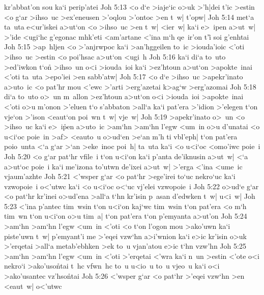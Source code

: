 kr'abbat'on
sou
ka`i
perip'atei\bibvsend
\vs Joh 5:13
<o
d`e
>iaje`ic
o>uk
>'h|dei
t'ic
>estin
<o
g`ar
>ihso~uc
>ex'eneusen
>'oqlou
>'ontoc
>en
t~w|
t'opw|\bibvsend
\vs Joh 5:14
met`a
ta~uta
e<ur'iskei
a>ut`on
<o
>ihso~uc
>en
t~w|
<ier~w|
ka`i
e>~ipen
a>ut~w|
>'ide
<ugi`hc
g'egonac
mhk'eti
<am'artane
<'ina
m`h
qe~ir'on
t'i\r{}
soi
g'enhtai\bibvsend
\vs Joh 5:15
>ap~hljen
<o
>'anjrwpoc
ka`i
>an'hggeilen
to~ic
>iouda'ioic
<'oti
>ihso~uc
>estin
<o
poi'hsac
a>ut`on
<ugi~h\bibvsend
\vs Joh 5:16
ka`i
di`a
to~uto
>ed'iwkon
t`on\r{}
>ihso~un
o<i
>iouda~ioi
ka`i
>ez'htoun
a>ut`on
>apokte~inai
<'oti
ta~uta
>epo'iei
>en
sabb'atw|\bibvsend
\vs Joh 5:17
<o
d`e
>ihso~uc
>apekr'inato
a>uto~ic
<o
pat'hr
mou
<'ewc
>'arti
>erg'azetai
k>ag`w
>erg'azomai\bibvsend
\vs Joh 5:18
di`a
to~uto
o>~un
m~allon
>ez'htoun
a>ut`on
o<i
>iouda~ioi
>apokte~inai
<'oti
o>u
m'onon
>'eluen
t`o
s'abbaton
>all`a
ka`i
pat'era
>'idion
>'elegen
t`on
vje`on
>'ison
<eaut`on
poi~wn
t~w|
vje~w|\bibvsend
\vs Joh 5:19
>apekr'inato
o>~un
<o
>ihso~uc
ka`i
e>~i\r{p}en
a>uto~ic
>am`hn
>am`hn
l'egw
<um~in
o>u
d'unatai
<o
u<i`oc
poie~in
>af>
<eauto~u
o>ud`en
>e`an
m'h
ti
vbl'eph|
t`on
pat'era
poio~unta
<`a
g`ar
>`an
>eke~inoc
poi~h|
ta~uta
ka`i
<o
u<i`oc
<omo'iwc
poie~i\bibvsend
\vs Joh 5:20
<o
g`ar
pat`hr
vfile~i
t`on
u<i`on
ka`i
p'anta
de'iknusin
a>ut~w|
<`a
a>ut`oc
poie~i
ka`i
me'izona
to'utwn
de'ixei
a>ut~w|
>'erga
<'ina
<ume~ic
vjaum'azhte\bibvsend
\vs Joh 5:21
<'wsper
g`ar
<o
pat`hr
>ege'irei
to`uc
nekro`uc
ka`i
vzwopoie~i
o<'utwc
ka`i
<o
u<i`oc
o<`uc
vj'elei
vzwopoie~i\bibvsend
\vs Joh 5:22
o>ud`e
g`ar
<o
pat`hr
kr'inei
o>ud'ena
>all`a
t`hn
kr'isin
p~asan
d'edwken
t~w|
u<i~w|\bibvsend
\vs Joh 5:23
<'ina
p'antec
tim~wsin
t`on
u<i`on
kaj`wc
tim~wsin
t`on
pat'era
<o
m`h
tim~wn
t`on
u<i`on
o>u
tim~a|
t`on
pat'era
t`on
p'emyanta
a>ut'on\bibvsend
\vs Joh 5:24
>am`hn
>am`hn
l'egw
<um~in
<'oti
<o
t`on
l'ogon
mou
>ako'uwn
ka`i
piste'uwn
t~w|
p'emyant'i
me
>'eqei
vzw`hn
a>i'wnion
ka`i
e>ic
kr'isin
o>uk
>'erqetai
>all`a
metab'ebhken
>ek
to~u
vjan'atou
e>ic
t`hn
vzw'hn\bibvsend
\vs Joh 5:25
>am`hn
>am`hn
l'egw
<um~in
<'oti
>'erqetai
<'wra
ka`i
n~un
>estin
<'ote
o<i
nekro`i
>ako'uso\r{n}tai
t~hc
vfwn~hc
to~u
u<io~u
to~u
vjeo~u
ka`i
o<i
>ako'usantec
vz'hso\r{n}tai\bibvsend
{}
\vs Joh 5:26
<'wsper
g`ar
<o
pat`hr
>'eqei
vzw`hn
>en
<eaut~w|
o<'utwc
